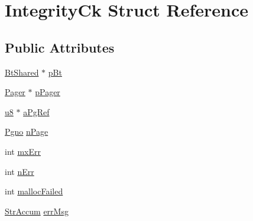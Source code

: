 \hypertarget{struct_integrity_ck}{\section{Integrity\-Ck Struct Reference}
\label{struct_integrity_ck}
}
\subsection*{Public Attributes}
\begin{DoxyCompactItemize}
\item 
\hyperlink{struct_bt_shared}{Bt\-Shared} $\ast$ \hyperlink{struct_integrity_ck_a65f03f54514f504bd871bb2ccd3da188}{p\-Bt}
\item 
\hyperlink{struct_pager}{Pager} $\ast$ \hyperlink{struct_integrity_ck_a87e7f8b012b61b61fae359269cbacce4}{p\-Pager}
\item 
\hyperlink{sqlite3_8c_a74a0f6424ae628af25f23f0a35f6ead3}{u8} $\ast$ \hyperlink{struct_integrity_ck_a317f80aef5842ad69df75b55e14118d1}{a\-Pg\-Ref}
\item 
\hyperlink{sqlite3_8c_aec0c653e8dd16e4639caf2f8ea54f55c}{Pgno} \hyperlink{struct_integrity_ck_a04f496ef7239aea6dccb6a861bb5a798}{n\-Page}
\item 
int \hyperlink{struct_integrity_ck_a9daa97cdcb1366c503451ab2af9e7ba6}{mx\-Err}
\item 
int \hyperlink{struct_integrity_ck_a52c815a1d19be87d0ab4dc0a4e4d38e2}{n\-Err}
\item 
int \hyperlink{struct_integrity_ck_a8e448c1d6483a0326a7ec39291782030}{malloc\-Failed}
\item 
\hyperlink{struct_str_accum}{Str\-Accum} \hyperlink{struct_integrity_ck_a1e9b79bb1d7b22a840001333200a950e}{err\-Msg}
\end{DoxyCompactItemize}


